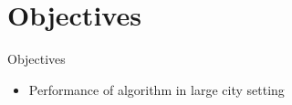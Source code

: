 \section{Objectives}


\begin{frame}{Objectives}
    \begin{itemize}
        \item Performance of algorithm in large city setting
    \end{itemize}
\end{frame}
